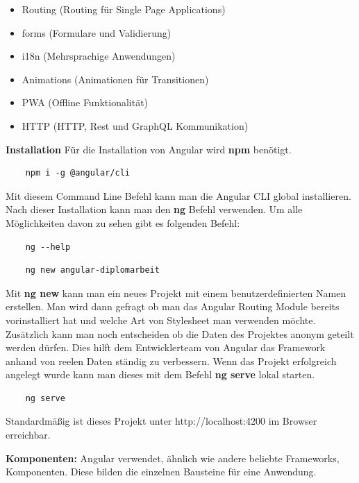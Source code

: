 \begin{itemize}
    \item Routing  (Routing für Single Page Applications)
    \item forms (Formulare und Validierung)
    \item i18n (Mehrsprachige Anwendungen)
    \item Animations (Animationen für Transitionen)
    \item PWA  (Offline Funktionalität)
    \item HTTP (HTTP, Rest und GraphQL Kommunikation)
\end{itemize}

\textbf{Installation}
\newline
Für die Installation von Angular wird \textbf{npm} benötigt.

\begin{lstlisting}
    npm i -g @angular/cli
\end{lstlisting}

Mit diesem Command Line Befehl kann man die Angular CLI global installieren. Nach dieser Installation kann man den \textbf{ng} Befehl verwenden. Um alle Möglichkeiten davon zu sehen gibt es folgenden Befehl:

\begin{lstlisting}
    ng --help
\end{lstlisting}
\newline
\begin{lstlisting}
    ng new angular-diplomarbeit
\end{lstlisting}

Mit \textbf{ng new} kann man ein neues Projekt mit einem benutzerdefinierten Namen erstellen. Man wird dann gefragt ob man das Angular Routing Module bereits vorinstalliert hat und welche Art von Stylesheet man verwenden möchte. Zusätzlich kann man noch entscheiden ob die Daten des Projektes anonym geteilt werden dürfen. Dies hilft dem Entwicklerteam von Angular das Framework anhand von reelen Daten ständig zu verbessern. Wenn das Projekt erfolgreich angelegt wurde kann man dieses mit dem Befehl \textbf{ng serve} lokal starten.

\begin{lstlisting}
    ng serve
\end{lstlisting}

Standardmäßig ist dieses Projekt unter http://localhost:4200 im Browser erreichbar. 

\textbf{Komponenten:}
\newline
Angular verwendet, ähnlich wie andere beliebte Frameworks, Komponenten. Diese bilden die einzelnen Bausteine für eine Anwendung.

